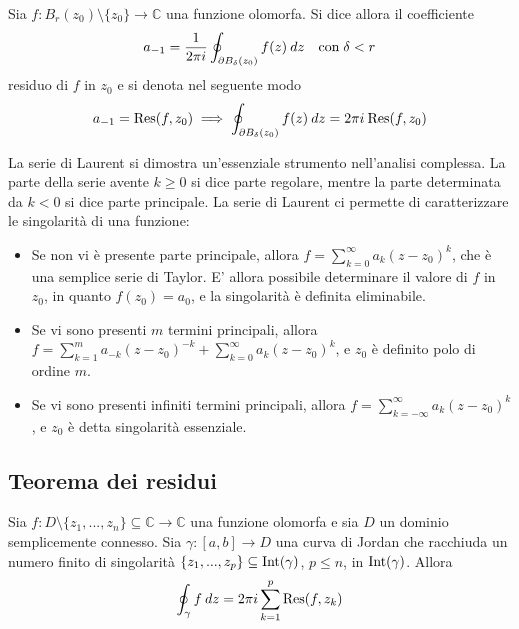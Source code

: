             \begin{definition}
                Sia $f: B_{r}(z_{0}) \setminus \{z_{0}\} \rightarrow \mathbb{C}$ una funzione olomorfa.
                Si dice allora il coefficiente
                \[
                    a_{-1} = \frac{1}{2 \pi i} \oint_{\partial B_{\delta}(z_{0})} f(z) \: dz \quad \textnormal{con} \; \delta < r
                \]
                residuo di $f$ in $z_{0}$ e si denota nel seguente modo
                \[
                    a_{-1} = \textnormal{Res}(f, z_{0}) \implies \oint_{\partial B_{\delta}(z_{0})} f(z) \: dz = 2 \pi i \: \textnormal{Res}(f, z_{0})
                \]
            \end{definition}


            La serie di Laurent si dimostra un'essenziale strumento nell'analisi complessa.
            La parte della serie avente $k \geq 0$ si dice parte regolare, mentre la parte determinata da $k < 0$ si dice parte principale.
            La serie di Laurent ci permette di caratterizzare le singolarità di una funzione:
            \begin{itemize}
                \item Se non vi è presente parte principale, allora $f = \sum_{k = 0}^{\infty} a_{k} (z - z_{0})^{k}$, che è una semplice serie di Taylor.
                E' allora possibile determinare il valore di $f$ in $z_{0}$, in quanto $f(z_{0}) = a_{0}$, e la singolarità è definita eliminabile.

                \item Se vi sono presenti $m$ termini principali, allora $f = \sum_{k = 1}^{m} a_{-k} (z - z_{0})^{-k} + \sum_{k = 0}^{\infty} a_{k} (z - z_{0})^{k}$, e $z_{0}$ è definito polo di ordine $m$.

                \item Se vi sono presenti infiniti termini principali, allora $f = \sum_{k = -\infty}^{\infty} a_{k}(z - z_{0})^{k}$, e $z_{0}$ è detta singolarità essenziale.
            \end{itemize}


    \subsection{Teorema dei residui}
            \begin{theorem}
                Sia $f: D \setminus \{z_{1}, ..., z_{n}\} \subseteq \mathbb{C} \rightarrow \mathbb{C}$ una funzione olomorfa e sia $D$ un dominio semplicemente connesso.
                Sia $\gamma: [a, b] \rightarrow D$ una curva di Jordan che racchiuda un numero finito di singolarità $\{z_{1}, ..., z_{p}\} \subseteq \textnormal{Int}(\gamma)$, $p \leq n$, in $\textnormal{Int}(\gamma)$.
                Allora
                \[
                    \oint_{\gamma} f \: dz = 2\pi i \sum_{k = 1}^{p} \textnormal{Res}(f, z_{k})
                \]
            \end{theorem}

